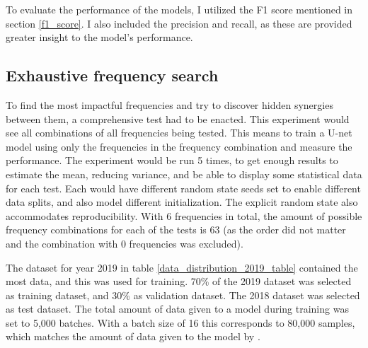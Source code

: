         To evaluate the performance of the models, I utilized the F1 score mentioned in section \ref{f1_score}. I also included the precision and recall, as these are provided greater insight to the model's performance.
        
    
    \subsection{Exhaustive frequency search}
    
        To find the most impactful frequencies and try to discover hidden synergies between them, a comprehensive test had to be enacted. This experiment would see all combinations of all frequencies being tested. This means to train a U-net model using only the frequencies in the frequency combination and measure the performance. The experiment would be run 5 times, to get enough results to estimate the mean,  reducing variance, and be able to display some statistical data for each test. Each would have different random state seeds set to enable different data splits, and also model different initialization. The explicit random state also accommodates reproducibility. With 6 frequencies in total, the amount of possible frequency combinations for each of the tests is 63 (as the order did not matter and the combination with 0 frequencies was excluded).
        
        The dataset for year 2019 in table \ref{data_distribution_2019_table} contained the most data, and this was used for training. 70\% of the 2019 dataset was selected as training dataset, and 30\% as validation dataset. The 2018 dataset was selected as test dataset. The total amount of data given to a model during training was set to 5,000 batches. With a batch size of 16 this corresponds to 80,000 samples, which matches the amount of data given to the model by \citeauthor{brautaset2020acoustic}\cite{brautaset2020acoustic}.
        
